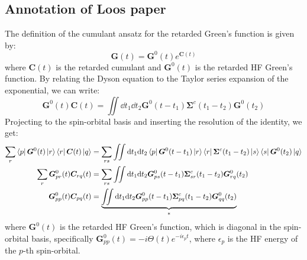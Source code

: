 \subsection{Annotation of Loos paper}
The definition of the cumulant ansatz for the retarded Green's function is given by:
\begin{equation}
    \bm{G}(t) = \bm{G}^0(t)e^{\bm{C}(t)}
\end{equation}
where $\bm{C}(t)$ is the retarded cumulant and $\bm{G}^0(t)$ is the retarded HF Green's function. By relating the Dyson equation to the Taylor series expansion of the exponential, we can write:
\begin{equation}
    \bm{G}^0(t) \bm{C}(t) = \iint \dd t_1 \dd t_2 \bm{G}^0(t-t_1) \bm{\Sigma}^c(t_1 - t_2) \bm{G}^0(t_2)
\end{equation}
Projecting to the spin-orbital basis and inserting the resolution of the identity, we get:
\begin{align}
    \sum_{r}\bra{p}\bm{G}^0(t) \ket{r}\bra{r}\bm{C}(t)\ket{q} &= \sum_{rs}\iint \dd t_1 \dd t_2 \bra{p}\bm{G}^0(t-t_1)\ket{r} \bra{r}\bm{\Sigma}^c(t_1 - t_2)\ket{s} \bra{s}\bm{G}^0(t_2)\ket{q} \\
    \sum_{r}\bm{G}_{pr}^0(t) \bm{C}_{rq}(t) &= \sum_{rs}\iint \dd t_1 \dd t_2 \bm{G}_{ps}^0(t-t_1) \bm{\Sigma}_{sr}^c(t_1 - t_2) \bm{G}_{rq}^0(t_2)\\
    \bm{G}_{pp}^{0}(t) \bm{C}_{pq}(t) &= \underbrace{\iint \dd t_1 \dd t_2 \bm{G}_{pp}^{0}(t-t_1) \bm{\Sigma}_{pq}^c(t_1 - t_2) \bm{G}_{qq}^{0}(t_2)}_{*}
    \label{eqn:cumulant_connection}
\end{align}
where $\bm{G}^0(t)$ is the retarded HF Green's function, which is diagonal in the spin-orbital basis, specifically $\bm{G}_{pp}^{0}(t) = -i\Theta(t)e^{-i\epsilon_p t}$, where $\epsilon_p$ is the HF energy of the $p$-th spin-orbital.
